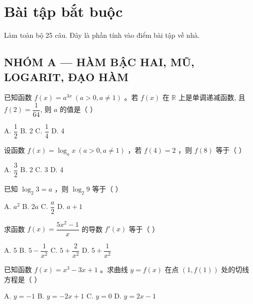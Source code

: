 \documentclass[11pt, a4paper]{article}
\begin{document}

\section{Bài tập bắt buộc}

Làm toàn bộ 25 câu. Đây là phần tính vào điểm bài tập về nhà.

\subsection*{NHÓM A — HÀM BẬC HAI, MŨ, LOGARIT, ĐẠO HÀM}

\begin{baitap}[1]
已知函数 $f(x) = a^{3x}\ (a > 0, a \ne 1)$ 。若 $f(x)$ 在 $\mathbb{R}$ 上是单调递减函数, 且 $f(2) = \dfrac{1}{64}$, 则 $a$ 的值是（ ）
\par\vspace{3pt}
\noindent A. $\dfrac{1}{2}$ \quad B. 2 \quad C. $\dfrac{1}{4}$ \quad D. 4
\end{baitap}

\begin{baitap}[2]
设函数 $f(x) = \log_a x\ (a > 0, a \ne 1)$ ，若 $f(4) = 2$ ，则 $f(8)$ 等于（ ）
\par\vspace{3pt}
\noindent A. $\dfrac{3}{2}$ \quad B. 2 \quad C. 3 \quad D. 4
\end{baitap}

\begin{baitap}[3]
已知 $\log_2 3 = a$ ，则 $\log_2 9$ 等于（ ）
\par\vspace{3pt}
\noindent A. $a^2$ \quad B. $2a$ \quad C. $\dfrac{a}{2}$ \quad D. $a + 1$
\end{baitap}

\begin{baitap}[4]
求函数 $f(x) = \dfrac{5x^2 - 1}{x}$ 的导数 $f'(x)$ 等于（ ）
\par\vspace{3pt}
\noindent A. 5 \quad B. $5 - \dfrac{1}{x^2}$ \quad C. $5 + \dfrac{2}{x^2}$ \quad D. $5 + \dfrac{1}{x^2}$
\end{baitap}

\begin{baitap}[5]
已知函数 $f(x) = x^3 - 3x + 1$ 。求曲线 $y = f(x)$ 在点 $(1, f(1))$ 处的切线方程是（ ）
\par\vspace{3pt}
\noindent A. $y = -1$ \quad B. $y = -2x + 1$ \quad C. $y = 0$ \quad D. $y = 2x - 1$
\end{baitap}
\end{document}
